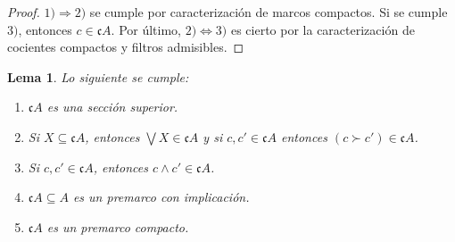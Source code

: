 \documentclass[11pt]{amsart}
\theoremstyle{plain}
\newtheorem{lem}[thm]{Lema}
\theoremstyle{definition}
\begin{document}
\begin{proof}
    $1)\Rightarrow 2)$ se cumple por caracterización de marcos compactos. Si se cumple $3)$, entonces $c\in \mathfrak{c}A$. Por último, $2) \Leftrightarrow 3)$ es cierto por la caracterización de cocientes compactos y filtros admisibles. 
\end{proof}

\begin{lem}\label{Lema2.3}
    Lo siguiente se cumple:
    \begin{enumerate}
        \item $\mathfrak{c}A$ es una sección superior.
        \item Si $X\subseteq \mathfrak{c}A$, entonces $\bigvee X\in \mathfrak{c}A$ y si $c, c'\in \mathfrak{c}A$ entonces $(c\succ c')\in \mathfrak{c}A$.
        \item Si $c, c'\in \mathfrak{c}A$, entonces $c\wedge c'\in \mathfrak{c}A$.
        \item $\mathfrak{c}A\subseteq A$ es un premarco con implicación.
        \item $\mathfrak{c}A$ es un premarco compacto.
    \end{enumerate}
\end{lem}
\end{document}
